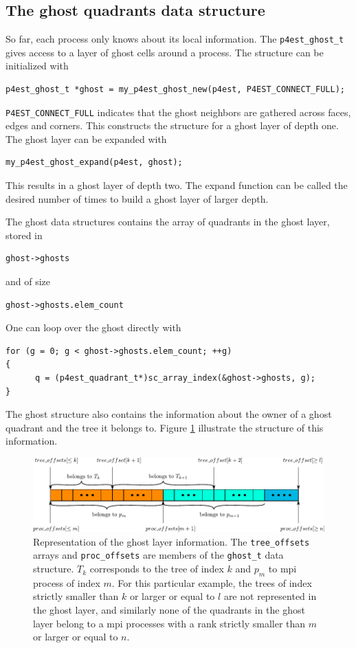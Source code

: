 \documentclass{article}
\newcommand{\ttt}[1]{\texttt{#1}}
\newcommand{\figb}{\begin{figure}[htbp]\begin{center}}
\newcommand{\fige}{\end{center}\end{figure}}
\begin{document}
\subsection{The ghost quadrants data structure}

So far, each process only knows about its local information. The \texttt{p4est\_ghost\_t} gives access to a layer of ghost cells around a process. The structure can be initialized with
\begin{Verbatim}[frame=single]
p4est_ghost_t *ghost = my_p4est_ghost_new(p4est, P4EST_CONNECT_FULL);
\end{Verbatim}
\ttt{P4EST\_CONNECT\_FULL} indicates that the ghost neighbors are gathered across faces, edges and corners. This constructs the structure for a ghost layer of depth one. The ghost layer can be expanded with
\begin{Verbatim}[frame=single]
my_p4est_ghost_expand(p4est, ghost);
\end{Verbatim}
This results in a ghost layer of depth two. The expand function can be called the desired number of times to build a ghost layer of larger depth.

The ghost data structures contains the array of quadrants in the ghost layer, stored in
\begin{Verbatim}[frame=single]
ghost->ghosts
\end{Verbatim}
and of size
\begin{Verbatim}[frame=single]
ghost->ghosts.elem_count
\end{Verbatim}
One can loop over the ghost directly with
\begin{Verbatim}[frame=single]
for (g = 0; g < ghost->ghosts.elem_count; ++g)
{
      q = (p4est_quadrant_t*)sc_array_index(&ghost->ghosts, g);
}
\end{Verbatim}
The ghost structure also contains the information about the owner of a ghost quadrant and the tree it belongs to. Figure \ref{fig::ghost_quadrants} illustrate the structure of this information.
\figb
\includegraphics[width=\textwidth]{figures/ghosts.pdf}
\caption{Representation of the ghost layer information. The \ttt{tree\_offsets} arrays and \ttt{proc\_offsets} are members of the \ttt{ghost\_t} data structure. $T_k$ corresponds to the tree of index $k$ and $p_m$ to mpi process of index $m$. For this particular example, the trees of index strictly smaller than $k$ or larger or equal to $l$ are not represented in the ghost layer, and similarly none of the quadrants in the ghost layer belong to a mpi processes with a rank strictly smaller than $m$ or larger or equal to $n$.} \label{fig::ghost_quadrants}
\fige
\end{document}
